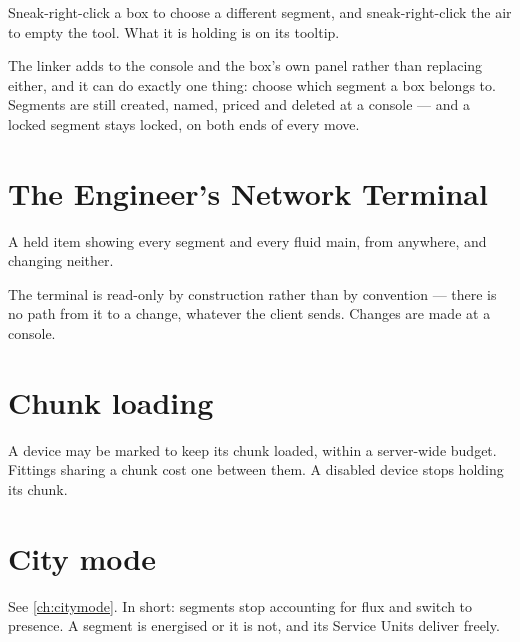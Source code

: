 Sneak-right-click a box to choose a different segment, and sneak-right-click the air to empty the
tool. What it is holding is on its tooltip.

\begin{ietip}
The linker adds to the console and the box's own panel rather than replacing either, and it can do
exactly one thing: choose which segment a box belongs to. Segments are still created, named, priced
and deleted at a console --- and a locked segment stays locked, on both ends of every move.
\end{ietip}

\section{The Engineer's Network Terminal}

A held item showing every segment and every fluid main, from anywhere, and changing neither.

\begin{ietip}
The terminal is read-only by construction rather than by convention --- there is no path from it to
a change, whatever the client sends. Changes are made at a console.
\end{ietip}

\section{Chunk loading}

A device may be marked to keep its chunk loaded, within a server-wide budget. Fittings sharing a
chunk cost one between them. A disabled device stops holding its chunk.

\section{City mode}

See \autoref{ch:citymode}. In short: segments stop accounting for flux and switch to presence. A
segment is energised or it is not, and its Service Units deliver freely.
